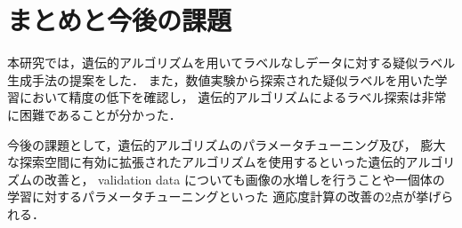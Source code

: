 \newpage
\changeindent{0cm}
\section{まとめと今後の課題}
\changeindent{2cm}
本研究では，遺伝的アルゴリズムを用いてラベルなしデータに対する疑似ラベル生成手法の提案をした．
また，数値実験から探索された疑似ラベルを用いた学習において精度の低下を確認し，
遺伝的アルゴリズムによるラベル探索は非常に困難であることが分かった．

今後の課題として，遺伝的アルゴリズムのパラメータチューニング及び，
膨大な探索空間に有効に拡張されたアルゴリズムを使用するといった遺伝的アルゴリズムの改善と，
validation data についても画像の水増しを行うことや一個体の学習に対するパラメータチューニングといった
適応度計算の改善の2点が挙げられる．




